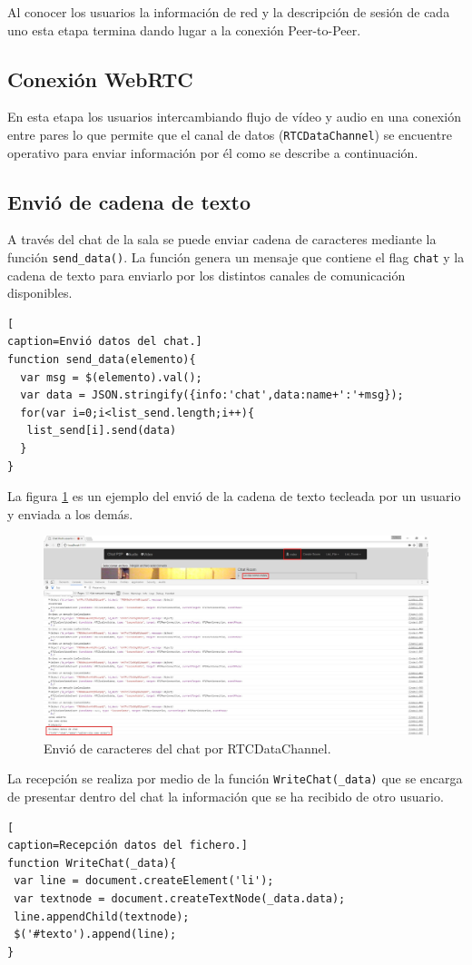 Al conocer los usuarios la información de red y la descripción de sesión de cada uno esta etapa termina dando lugar a la conexión Peer-to-Peer.
\subsection*{Conexión WebRTC}
En esta etapa los usuarios intercambiando flujo de vídeo y audio en una conexión entre pares lo que permite que el canal de datos (\texttt{RTCDataChannel}) se encuentre operativo para enviar información por él como se describe a continuación.
\subsection*{Envió de cadena de texto}
A través del chat de la sala se puede enviar cadena de caracteres mediante la función \texttt{send\_data()}. La función genera un mensaje que contiene el flag \texttt{chat} y la cadena de texto para enviarlo por los distintos canales de comunicación disponibles. 
\begin{lstlisting}[
caption=Envió datos del chat.]
function send_data(elemento){
  var msg = $(elemento).val();
  var data = JSON.stringify({info:'chat',data:name+':'+msg});
  for(var i=0;i<list_send.length;i++){
   list_send[i].send(data)
  }
}
\end{lstlisting}
La figura \ref{fig:ChatClienteSend} es un ejemplo del envió de la cadena de texto tecleada por un usuario y enviada a los demás.

\begin{figure}[!h]
\centering
\includegraphics[width=1\linewidth]{Figures/ChatClienteSend}
\decoRule
\caption[Envió de caracteres del chat por RTCDataChannel.]{Envió de caracteres del chat por RTCDataChannel.}
\label{fig:ChatClienteSend}
\end{figure}

La recepción se realiza por medio de la función \texttt{WriteChat(\_data)} que se encarga de presentar dentro del chat la información que se ha recibido de otro usuario.
\begin{lstlisting}[
caption=Recepción datos del fichero.]
function WriteChat(_data){
 var line = document.createElement('li');
 var textnode = document.createTextNode(_data.data);
 line.appendChild(textnode);
 $('#texto').append(line);
}
\end{lstlisting}

